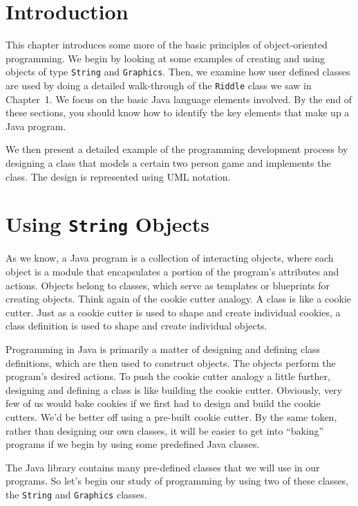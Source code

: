 \section{Introduction}
\label{introduction}
\noindent This chapter introduces some more of the basic principles of
object-oriented programming.  We begin
by looking at some examples of creating and using objects of 
type {\tt String} and {\tt Graphics}.
Then, we examine how user defined classes are used by doing a detailed
walk-through of the {\tt Riddle} class we saw in Chapter~1.
We focus on the basic Java language elements involved.  By the end of 
these sections,
you should know how to identify the key elements that make up a Java program.

We then present a detailed example of the programming development
process by designing a class that models a certain two person game
and implements the class.
The design is represented using UML notation.

\section{Using {\tt String} Objects}
\label{using-objects}

\noindent As we know, a Java program is a collection of interacting
objects, where each object is a module that encapsulates a portion of
the program's attributes and actions. Objects belong to classes, which
serve as templates or blueprints for creating objects. Think again of
the cookie cutter analogy. A class is like a cookie cutter. Just as a
cookie cutter is used to shape and create individual cookies, a class
definition is used to shape and create individual objects.

Programming in Java is primarily a matter of designing and defining
class definitions, which are then used to construct objects. The
objects perform the program's desired actions. To push the cookie
cutter analogy a little further, designing and defining a class is
like building the cookie cutter.  Obviously, very few of us would bake
cookies if we first had to design and build the cookie cutters. We'd
be better off using a pre-built cookie cutter. By the same token,
rather than designing our own classes, it will be easier to get into
``baking'' programs if we begin by using some predefined Java classes.

The Java library contains many pre-defined classes that we will use in
our programs. So let's begin our study of programming by using two of
these classes, the {\tt String} and {\tt Graphics} classes.

